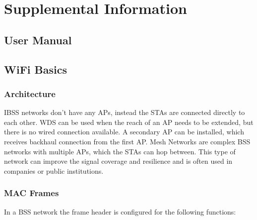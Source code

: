 \chapter{Supplemental Information}\label{app:supplemental-information}


\section{User Manual}


\section{WiFi Basics}

\subsection{Architecture}\label{ssec:A_wifi_architecture}
IBSS networks don't have any APs, instead the STAs are connected directly to each other.
WDS can be used when the reach of an AP needs to be extended, but there is no wired connection available. 
A secondary AP can be installed, which receives backhaul connection from the first AP.
Mesh Networks are complex BSS networks with multiple APs, which the STAs can hop between.
This type of network can improve the signal coverage and resilience and is often used in companies or public institutions. \cite[page~8-9]{Sankaran_Gulasekaran_2021}

\subsection{MAC Frames}\label{ssec:A_wifi_mac_frames}
In a BSS network the frame header is configured for the following functions:

